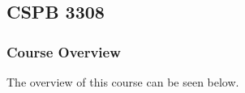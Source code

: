 \clearpage

\renewcommand{\ChapTitle}{\CSPBSoftDev}
\renewcommand{\SectionTitle}{CSPB 3308}

\chapter{\ChapTitle}
\section{\SectionTitle}

\subsection{Course Overview}

The overview of this course can be seen below.

